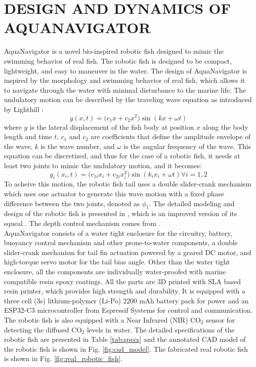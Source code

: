 \documentclass[12pt, draftclsnofoot, onecolumn]{IEEEtran}
\begin{document}
\section{DESIGN AND DYNAMICS OF AQUANAVIGATOR}{\label {sec:design}}
AquaNavigator is a novel bio-inspired robotic fish designed to mimic the swimming behavior of real fish. The robotic fish is designed to be compact, lightweight, and easy to maneuver in the water. The design of AquaNavigator is inspired by the morphology and swimming behavior of real fish, which allows it to navigate through the water with minimal disturbance to the marine life. The undulatory motion can be described by the traveling wave equation as introduced by Lighthill \cite{Lighthill1969}:
\begin{equation}
y(x,t) = \big(c_1 x + c_2 x^2\big) \sin(kx + \omega t)
\end{equation}
where $y$ is the lateral displacement of the fish body at position $x$ along the body length and time $t$, $c_1$ and $c_2$ are coefficients that define the amplitude envelope of the wave, $k$ is the wave number, and $\omega$ is the angular frequency of the wave. This equation can be discretized, and thus for the case of a robotic fish, it needs at least two joints to mimic the undulatory motion, and it becomes:
\begin{equation}
    y_i(x_i,t) = \big(c_{1i} x_i + c_{2i} x_i^2\big) \sin(k_i x_i + \omega t) \forall i=1,2
\end{equation}
To acheive this motion, the robotic fish tail uses a double slider-crank mechanism \cite{Masood2025} which uses one actuator to generate this wave motion with a fixed phase difference between the two joints, denoted as $\phi_1$. The detailed modeling and design of the robotic fish is presented in \cite{Masood2025}, which is an improved version of its squeal \cite{Zuo2021}. The depth control mechanism comes from \cite{Masood2023}. \\
AquaNavigator consists of a water tight enclosure for the circuitry, battery, buoyancy control mechanism and other prone-to-water components, a double slider-crank mechanism for tail fin actuation powered by a geared DC motor, and high-torque servo motor for the tail bias angle. Other than the water tight enclosure, all the components are individually water-proofed with marine compatible resin epoxy coatings. All the parts are 3D printed with SLA based resin printer, which provides high strength and durability. It is equipped with a three cell (3s) lithium-polymer (Li-Po) 2200 mAh battery pack for power and an ESP32-C3 microcontroller from Espressif Systems for control and communication. The robotic fish is also equipped with a Near Infrared (NIR) CO$_2$ sensor for detecting the diffused CO$_2$ levels in water. The detailed specifications of the robotic fish are presented in Table \ref{tab:specs} and the annotated CAD model of the robotic fish is shown in Fig. \ref{fig:cad_model}. The fabricated real robotic fish is shown in Fig. \ref{fig:real_robotic_fish}.
\end{document}
